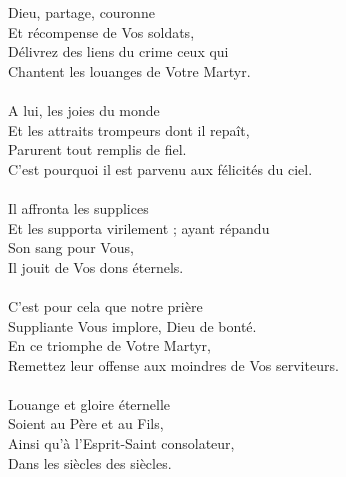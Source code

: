 Dieu, partage, couronne\\
Et récompense de Vos soldats,\\
Délivrez des liens du crime ceux qui\\
Chantent les louanges de Votre Martyr.\\
\\
A lui, les joies du monde\\
Et les attraits trompeurs dont il repaît,\\
Parurent tout remplis de fiel.\\
C'est pourquoi il est parvenu aux félicités du ciel.\\
\\
Il affronta les supplices\\
Et les supporta virilement ; ayant répandu\\
Son sang pour Vous,\\
Il jouit de Vos dons éternels.\\
\\
C'est pour cela que notre prière\\
Suppliante Vous implore, Dieu de bonté.\\
En ce triomphe de Votre Martyr,\\
Remettez leur offense aux moindres de Vos serviteurs.\\
\\
Louange et gloire éternelle\\
Soient au Père et au Fils,\\
Ainsi qu'à l'Esprit-Saint consolateur,\\
Dans les siècles des siècles.